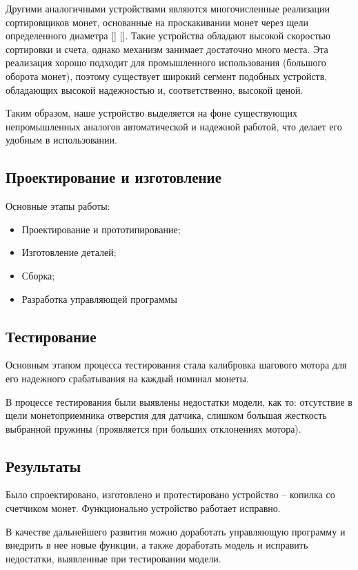 Другими аналогичными устройствами являются многочисленные реализации сортировщиков монет, основанные на проскакивании монет через щели определенного диаметра [] []. Такие устройства обладают высокой скоростью сортировки и счета, однако механизм занимает достаточно много места. Эта реализация хорошо подходит для промышленного использования (большого оборота монет), поэтому существует широкий сегмент подобных устройств, обладающих высокой надежностью и, соответственно, высокой ценой. 

Таким образом, наше устройство выделяется на фоне существующих непромышленных аналогов автоматической и надежной работой, что делает его удобным в использовании.

\subsection {Проектирование и изготовление}

Основные этапы работы:

\begin{itemize}
	\item Проектирование и прототипирование; 
	\item Изготовление деталей;
	\item Сборка;
	\item Разработка управляющей программы
\end{itemize}






\subsection {Тестирование}

Основным этапом процесса тестирования стала калибровка шагового мотора для его надежного срабатывания на каждый номинал монеты. 

В процессе тестирования были выявлены недостатки модели, как то: отсутствие в щели монетоприемника отверстия для датчика, слишком большая жесткость выбранной пружины (проявляется при больших отклонениях мотора).

\subsection {Результаты}

Было спроектировано, изготовлено и протестировано устройство -- копилка со счетчиком монет. Функционально устройство работает исправно. 

В качестве дальнейшего развития можно доработать управляющую программу и внедрить в нее новые функции, а также доработать модель и исправить недостатки, выявленные при тестировании модели.